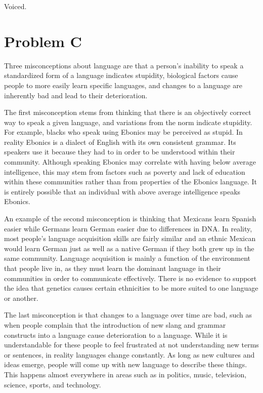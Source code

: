 \documentclass[12pt]{article}
\begin{document}
Voiced.

\section*{Problem C}

Three misconceptions about language are that a person's inability to speak a standardized form of a language indicates stupidity,
biological factors cause people to more easily learn specific languages, and changes to a language are inherently bad and lead to their deterioration.

The first misconception stems from thinking that there is an objectively correct way to speak a given language, and variations
from the norm indicate stupidity. For example, blacks who speak using Ebonics may be perceived as stupid. In reality Ebonics is a dialect of
English with its own consistent grammar. Its speakers use it because they had to in order to be understood within their community. Although
speaking Ebonics may correlate with having below average intelligence, this may stem from factors such as poverty and lack of education within these
communities rather than from properties of the Ebonics language. It is entirely possible that an individual with above average intelligence speaks Ebonics.

An example of the second misconception is thinking that Mexicans learn Spanish easier while Germans learn German easier due to differences in DNA.
In reality, most people's language acquisition skills are fairly similar and an ethnic Mexican would learn German just as well as a native German
if they both grew up in the same community. Language acquisition is mainly a function of the environment that people live in, as they must learn
the dominant language in their communities in order to communicate effectively. There is no evidence to support the idea that genetics causes certain
ethnicities to be more suited to one language or another.

The last misconception is that changes to a language over time are bad, such as when people complain that the introduction of new slang and
grammar constructs into a language cause deterioration to a language. While it is understandable for these people to feel frustrated
at not understanding new terms or sentences, in reality languages change constantly. As long as new cultures and ideas emerge, people
will come up with new language to describe these things. This happens almost everywhere in areas such as in politics, music, television, science,
sports, and technology.
\end{document}
